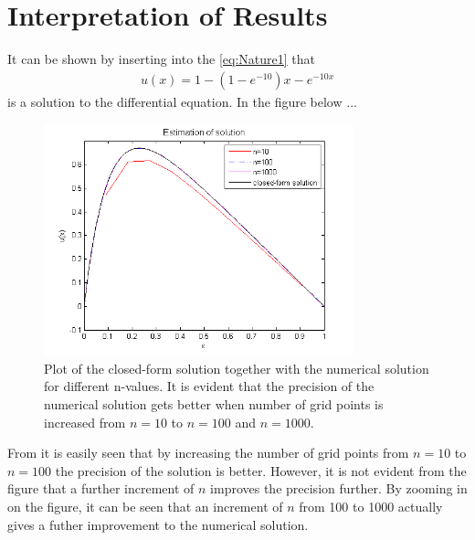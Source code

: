 \section{Interpretation of Results}
\label{sec:InterpretationOfResults}
It can be shown by inserting into the \eqref{eq:Nature1} that 
\begin{align}
	u(x) = 1-(1-e^{-10})x-e^{-10x}
	\label{eq:IntOfResult1a}
\end{align}
is a solution to the differential equation. 
In the figure below ...
\begin{figure}[H]
	\centering
	\includegraphics[width=0.8\textwidth]{Figures/estimaition_of_solution.png}
	\caption{Plot of the closed-form solution together with the numerical solution for different n-values. It is evident that the precision of the numerical solution gets better when number of grid points is increased from $n=10$ to $n=100$ and $n=1000$.}
	\label{fig:IntOfResult1}
\end{figure}
From  it is easily seen that by increasing the number of grid points from $n=10$ to $n=100$ the precision of the solution is better. 
However, it is not evident from the figure that a further increment of $n$ improves the precision further. 
By zooming in on the figure, it can be seen that an increment of $n$ from 100 to 1000 actually gives a futher improvement to the numerical solution.   
